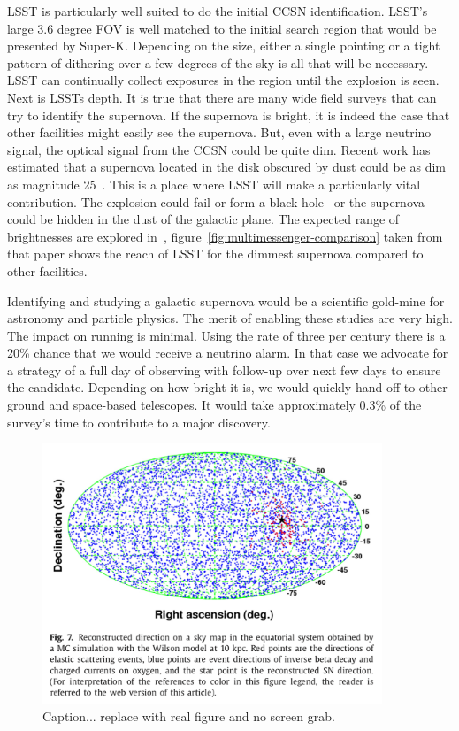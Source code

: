 \documentclass[12pt, letterpaper]{article}
\newcommand{\superk}  {Super\nobreakdash-K\xspace}
\begin{document}
LSST is particularly well suited to do the initial CCSN
identification.  LSST's large 3.6 degree FOV is well matched to the
initial search region that would be presented by \superk.  Depending
on the size, either a single pointing or a tight pattern of dithering
over a few degrees of the sky is all that will be necessary.  LSST can
continually collect exposures in the region until the explosion is
seen. Next is LSSTs depth. It is true that there are many wide field
surveys that can try to identify the supernova.  If the supernova is
bright, it is indeed the case that other facilities might easily see
the supernova.  But, even with a large neutrino signal, the optical
signal from the CCSN could be quite dim.  Recent work has estimated
that a supernova located in the disk obscured by dust could be as dim
as magnitude 25~\cite{2016MNRAS.461.3296N}.  This is a place where
LSST will make a particularly vital contribution.  The explosion could
fail or form a black hole~\cite{2011ApJ...730...70O,
  2017hsn..book.1555O} or the supernova could be hidden in the dust of
the galactic plane.  The expected range of brightnesses are explored
in~\cite{2016MNRAS.461.3296N},
figure~\ref{fig:multimessenger-comparison} taken from that paper shows
the reach of LSST for the dimmest supernova compared to other
facilities.

Identifying and studying a galactic supernova would be a scientific
gold-mine for astronomy and particle physics.  The merit of enabling
these studies are very high. The impact on running is minimal.  Using
the rate of three per century there is a 20\% chance that we would
receive a neutrino alarm. In that case we advocate for a strategy of a
full day of observing with follow-up over next few days to ensure the
candidate.  Depending on how bright it is, we would quickly hand off
to other ground and space-based telescopes.  It would take
approximately 0.3\% of the survey's time to contribute to a major
discovery.

\clearpage

\begin{figure}
  \begin{center}
    \includegraphics[width=4.0in]{SK-realtime-monitor-pointing}
    \caption{Caption... replace with real figure and no screen grab.}
    \label{fig:SK-realtime-monitor-pointing}
  \end{center}
\end{figure}
\end{document}
